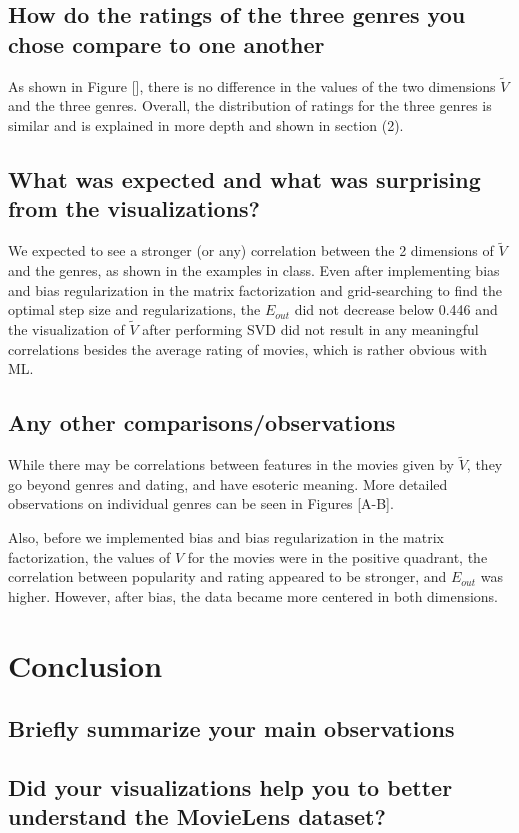 \subsection*{How do the ratings of the three genres you chose compare to one another}
As shown in Figure [], there is no difference in the values of the two dimensions $\widetilde{V}$ and the three genres. Overall, the distribution of ratings for the three genres is similar and is explained in more depth and shown in section (2).

\subsection*{What was expected and what was surprising from the visualizations?}
We expected to see a stronger (or any) correlation between the 2 dimensions of $\widetilde{V}$ and the genres, as shown in the examples in class. Even after implementing bias and bias regularization in the matrix factorization and grid-searching to find the optimal step size and regularizations, the $E_{out}$ did not decrease below 0.446 and the visualization of $\widetilde{V}$ after performing SVD did not result in any meaningful correlations besides the average rating of movies, which is rather obvious with ML.

\subsection{Any other comparisons/observations}
While there may be correlations between features in the movies given by $\widetilde{V}$, they go beyond genres and dating, and have esoteric meaning. More detailed observations on individual genres can be seen in Figures [A-B].

Also, before we implemented bias and bias regularization in the matrix factorization, the values of $V$ for the movies were in the positive quadrant, the correlation between popularity and rating appeared to be stronger, and $E_{out}$ was higher. However, after bias, the data became more centered in both dimensions.


\section{Conclusion}
\medskip
\subsection*{Briefly summarize your main observations}
\subsection*{Did your visualizations help you to better understand the MovieLens dataset?}

